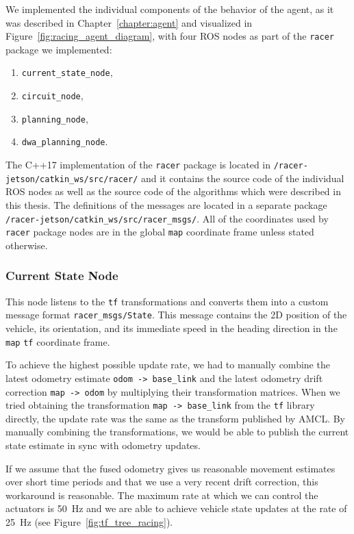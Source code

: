We implemented the individual components of the behavior of the agent, as it was described in Chapter~\ref{chapter:agent} and visualized in Figure~\ref{fig:racing_agent_diagram}, with four \gls*{ROS} nodes as part of the \verb|racer| package we implemented:

\begin{enumerate}
	\item \verb|current_state_node|,	
	\item \verb|circuit_node|,
	\item \verb|planning_node|,	
	\item \verb|dwa_planning_node|.
\end{enumerate}

The C++17 implementation of the \verb|racer| package is located in \texttt{/racer-jetson/\allowbreak catkin\_ws/\allowbreak src/racer/} and it contains the source code of the individual \gls*{ROS} nodes as well as the source code of the algorithms which were described in this thesis. The definitions of the messages are located in a separate package \texttt{/racer-jetson/\allowbreak catkin\_ws/\allowbreak src/racer\_msgs/}. All of the coordinates used by \verb|racer| package nodes are in the global \verb|map| coordinate frame unless stated otherwise.

\subsubsection{Current State Node}

This node listens to the \verb|tf| transformations and converts them into a custom message format \verb|racer_msgs/State|. This message contains the 2D position of the vehicle, its orientation, and its immediate speed in the heading direction in the \verb|map| \verb|tf| coordinate frame.

To achieve the highest possible update rate, we had to manually combine the latest odometry estimate \verb|odom -> base_link| and the latest odometry drift correction \verb|map -> odom| by multiplying their transformation matrices. When we tried obtaining the transformation \verb|map -> base_link| from the \verb|tf| library directly, the update rate was the same as the transform published by \gls*{AMCL}. By manually combining the transformations, we would be able to publish the current state estimate in sync with odometry updates.

If we assume that the fused odometry gives us reasonable movement estimates over short time periods and that we use a very recent drift correction, this workaround is reasonable. The maximum rate at which we can control the actuators is \SI{50}{\hertz} and we are able to achieve vehicle state updates at the rate of \SI{25}{\hertz} (see Figure~\ref{fig:tf_tree_racing}).

